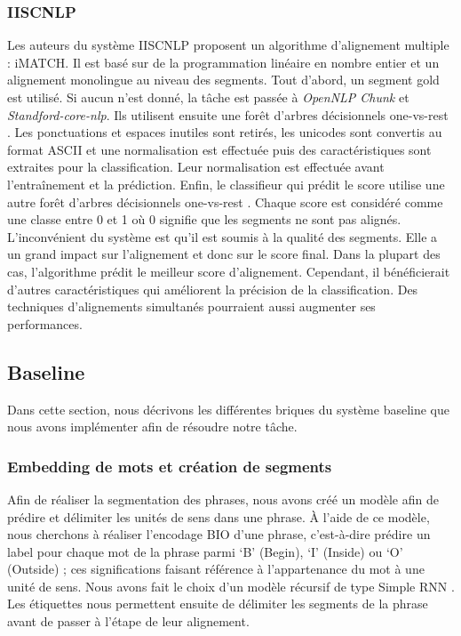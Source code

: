 \documentclass[a4paper, twoside, 11pt]{article}
\begin{document}
        \subsubsection{IISCNLP}
 Les auteurs du système IISCNLP \cite{tekumalla} proposent un algorithme d’alignement multiple : iMATCH. Il est basé sur de la programmation linéaire en nombre entier et un alignement monolingue au niveau des segments. Tout d’abord, un segment \og gold \fg{} est utilisé. Si aucun n’est donné, la tâche est passée à \textit{OpenNLP Chunk} et \textit{Standford-core-nlp}. Ils utilisent ensuite une forêt d'arbres décisionnels \og one-vs-rest \fg{}. Les ponctuations et espaces inutiles sont retirés, les unicodes sont convertis au format ASCII et une normalisation est effectuée puis des caractéristiques sont extraites pour la classification. Leur normalisation est effectuée avant l’entraînement et la prédiction. Enfin, le classifieur qui prédit le score utilise une autre forêt d'arbres décisionnels \og one-vs-rest \fg{}. Chaque score est considéré comme une classe entre 0 et 1 où 0 signifie que les segments ne sont pas alignés. L’inconvénient du système est qu’il est soumis à la qualité des segments. Elle a un grand impact sur l’alignement et donc sur le score final. Dans la plupart des cas, l’algorithme prédit le meilleur score d’alignement. Cependant, il bénéficierait d’autres caractéristiques qui améliorent la précision de la classification. Des techniques d’alignements simultanés pourraient aussi augmenter ses performances.

    \subsection{Baseline}

    Dans cette section, nous décrivons les différentes briques du système baseline que nous avons implémenter afin de résoudre notre tâche.

    \subsubsection{Embedding de mots et création de segments}
 Afin de réaliser la segmentation des phrases, nous avons créé un modèle afin de prédire et délimiter les unités de sens dans une phrase. À l’aide de ce modèle, nous cherchons à réaliser l'encodage BIO d’une phrase, c’est-à-dire prédire un label pour chaque mot de la phrase parmi ‘B’ (Begin), ‘I’ (Inside) ou ‘O’ (Outside) ; ces significations faisant référence à l’appartenance du mot à une unité de sens. Nous avons fait le choix d’un modèle récursif de type \og Simple RNN \fg{}. Les étiquettes nous permettent ensuite de délimiter les segments de la phrase avant de passer à l’étape de leur alignement.
\end{document}
